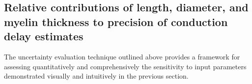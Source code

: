 \subsection{Relative contributions of length, diameter, and myelin thickness to precision of conduction delay estimates}

The uncertainty evaluation technique outlined above provides a framework for assessing quantitatively and comprehensively the sensitivity to input parameters demonstrated visually and
intuitively in the previous section. 


